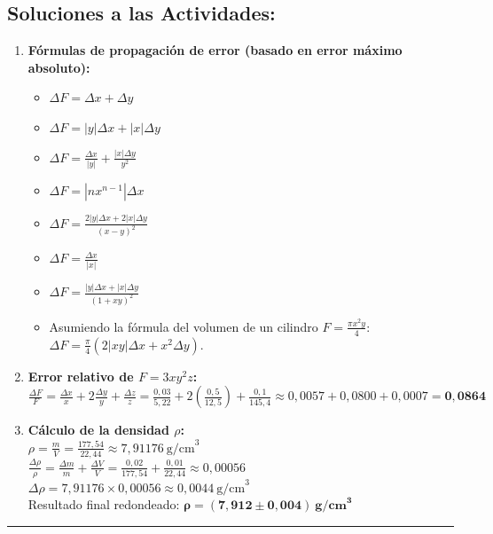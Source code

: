 \documentclass[12pt,a4paper]{article}
\begin{document}
\subsection*{Soluciones a las Actividades:}
\begin{enumerate}
    \item \textbf{Fórmulas de propagación de error (basado en error máximo absoluto):}
    \begin{itemize}
        \item[a)] $\Delta F = \Delta x + \Delta y$
        \item[b)] $\Delta F = |y|\Delta x + |x|\Delta y$
        \item[c)] $\Delta F = \frac{\Delta x}{|y|} + \frac{|x|\Delta y}{y^2}$
        \item[d)] $\Delta F = |n x^{n-1}| \Delta x$
        \item[e)] $\Delta F = \frac{2|y|\Delta x + 2|x|\Delta y}{(x-y)^2}$
        \item[f)] $\Delta F = \frac{\Delta x}{|x|}$
        \item[g)] $\Delta F = \frac{|y|\Delta x + |x|\Delta y}{(1+xy)^2}$
        \item[i)] Asumiendo la fórmula del volumen de un cilindro $F = \frac{\pi x^2 y}{4}$: $\Delta F = \frac{\pi}{4}(2|xy|\Delta x + x^2\Delta y)$.
    \end{itemize}
    \item \textbf{Error relativo de $F = 3xy^2z$:} \\
    $\frac{\Delta F}{F} = \frac{\Delta x}{x} + 2\frac{\Delta y}{y} + \frac{\Delta z}{z} = \frac{0,03}{5,22} + 2\left(\frac{0,5}{12,5}\right) + \frac{0,1}{145,4} \approx 0,0057 + 0,0800 + 0,0007 = \mathbf{0,0864}$
    \item \textbf{Cálculo de la densidad $\rho$:} \\
    $\rho = \frac{m}{V} = \frac{177,54}{22,44} \approx 7,91176\ \text{g/cm}^3$ \\
    $\frac{\Delta \rho}{\rho} = \frac{\Delta m}{m} + \frac{\Delta V}{V} = \frac{0,02}{177,54} + \frac{0,01}{22,44} \approx 0,00056$ \\
    $\Delta \rho = 7,91176 \times 0,00056 \approx 0,0044\ \text{g/cm}^3$ \\
    Resultado final redondeado: $\mathbf{\rho = (7,912 \pm 0,004)\ \text{g/cm}^3}$
\end{enumerate}

\vspace{0.5cm}
\hrule
\vspace{0.5cm}
\end{document}
